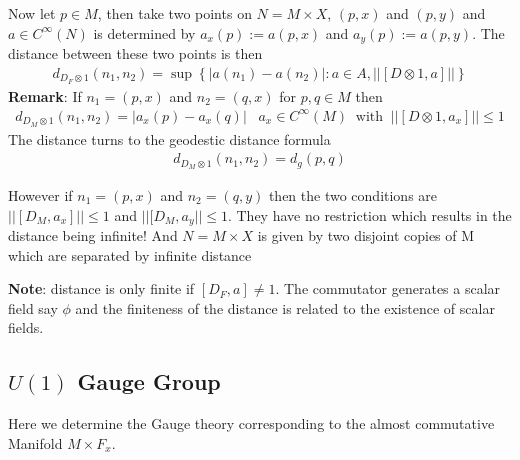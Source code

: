\documentclass[a4paper]{article}
\theoremstyle{definition}
\theoremstyle{definition}
\theoremstyle{definition}
\theoremstyle{theorem}
\theoremstyle{theorem}
\theoremstyle{theorem}
\begin{document}
    Now let $p \in M$, then take two points on $N=M\times X$, $(p, x)$ and
    $(p,y)$ and $a \in C^\infty(N)$ is determined by $a_x(p):=a(p, x)$ and
    $a_y(p):=a(p, y)$. The distance between these two points is then
    \begin{align}
        d_{D_F\otimes 1}(n_1, n_2) =  \sup \left\{ |a(n_1) - a(n_2)|: a\in
        A, ||[D\otimes 1, a]||\right\}
    \end{align}
    \textbf{Remark}: If $n_1 = (p,x)$ and $n_2 = (q, x)$ for $p,q \in M$ then
    \begin{align}
        d_{D_M \otimes 1} (n_1, n_2) = |a_x(p) - a_x(q)| \;\;\; a_x\in
        C^\infty(M) \;\; \text{with} \;\; ||[D\otimes 1, a_x]|| \leq 1
    \end{align}
    The distance turns to the geodestic distance formula
    \begin{align}
        d_{D_M\otimes1}(n_1, n_2) = d_g(p, q)
    \end{align}

    However if $n_1 = (p, x)$ and $n_2 = (q, y)$ then the two conditions are
    $||[D_M, a_x]|| \leq 1$ and $||[D_M, a_y|| \leq 1$. They have no
    restriction which results in the distance being infinite! And $N =
    M\times X$ is given by two disjoint copies of M  which are separated by
    infinite distance

    \textbf{Note}: distance is only finite if $[D_F, a] \neq 1$. The
    commutator
    generates a scalar field say $\phi$ and the finiteness of the distance is
    related to the existence of scalar fields.
    \subsection{$U(1)$ Gauge Group}
    Here we determine the Gauge theory corresponding to the almost
    commutative
    Manifold $M\times F_x$.
\end{document}
